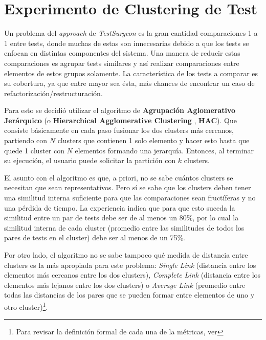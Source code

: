 \chapter{Experimento de Clustering de Test}


\par Un problema del \emph{approach} de \emph{TestSurgeon} es la gran cantidad  comparaciones 1-a-1 entre tests, donde muchas de estas son innecesarias debido a que los tests se enfocan en distintas componentes del sistema. Una manera de reducir estas comparaciones es agrupar tests similares y así realizar comparaciones entre elementos de estos grupos solamente. La característica de los tests a comparar es su cobertura, ya que entre mayor sea ésta, más chances de encontrar un caso de refactorización/restructuración. 

\par Para esto se decidió utilizar el algoritmo de \textbf{Agrupación Aglomerativo Jerárquico} (o \textbf{Hierarchical Agglomerative Clustering }, \textbf{HAC}). Que consiste básicamente en cada paso fusionar los dos clusters más cercanos, partiendo con $N$ clusters que contienen 1 solo elemento y hacer esto hasta que quede 1 cluster con $N$ elementos formando una jerarquía. Entonces, al terminar su ejecución, el usuario puede solicitar la partición con $k$ clusters. 

\par El asunto con el algoritmo es que, a priori, no se sabe cuántos clusters se necesitan que sean representativos. Pero sí se sabe que los clusters deben tener una similitud interna suficiente para que las comparaciones sean fructíferas y no una pérdida de tiempo. La experiencia indica que para que esto suceda la similitud entre un par de tests debe ser de al menos un 80\%, por lo cual la similitud interna de cada cluster (promedio entre las similitudes de todos los pares de tests en el cluster) debe ser al menos de un 75\%. 

\par Por otro lado, el algoritmo  no se sabe tampoco qué medida de distancia entre clusters es la más apropiada para este problema: \emph{Single Link} (distancia entre los elementos más cercanos entre los dos clusters), \emph{Complete Link} (distancia entre los elementos más lejanos entre los dos clusters) o \emph{Average Link} (promedio entre todas las distancias de los pares que se pueden formar entre elementos de uno y otro cluster)\footnote{Para revisar la definición formal de cada una de la métricas, ver }.  

